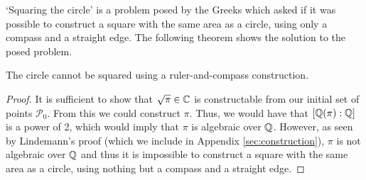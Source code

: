 `Squaring the circle' is a problem posed by the Greeks which asked if it was possible to construct a square with the same area as a circle, using only a compass and a straight edge. The following theorem shows the solution to the posed problem.

\begin{theorem}
    The circle cannot be squared using a ruler-and-compass construction.
\end{theorem}

\begin{proof}  
    
    It is sufficient to show that $\sqrt{\pi}\in \mathbb C$ is constructable from our initial set of points $\mathcal{P}_0$. From this we could construct $\pi$. Thus, we would have that $[\mathbb Q(\pi):\mathbb Q]$ is a power of 2, which would imply that $\pi$ is algebraic over $\mathbb Q$. However, as seen by Lindemann's proof (which we include in Appendix \ref{sec:construction}), $\pi$ is not algebraic over $\mathbb Q$ and thus it is impossible to construct a square with the same area as a circle, using nothing but a compass and a straight edge.
\end{proof}
